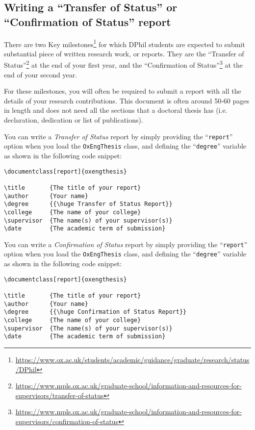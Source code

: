 \subsection{Writing a ``Transfer of Status'' or ``Confirmation of Status'' report}


There are two Key milestones\footnote{\url{https://www.ox.ac.uk/students/academic/guidance/graduate/research/status/DPhil}} for which DPhil students are expected to submit substantial piece of written research work, or reports. They are the ``Transfer of Status''\footnote{\url{https://www.mpls.ox.ac.uk/graduate-school/information-and-resources-for-supervisors/transfer-of-status}} at the end of your first year, and the ``Confirmation of Status''\footnote{\url{https://www.mpls.ox.ac.uk/graduate-school/information-and-resources-for-supervisors/confirmation-of-status}} at the end of your second year. 

For these milestones, you will often be required to submit a report with all the details of your research contributions. This document is often around 50-60 pages in length and does not need all the sections that a doctoral thesis has (i.e. declaration, dedication or list of publications). 

You can write a \textit{Transfer of Status} report by simply providing the ``\verb|report|'' option when you load the \verb|OxEngThesis| class, and defining the ``\verb|degree|'' variable as shown in the following code snippet:


\begin{lstlisting}[style=custom-latex]
\documentclass[report]{oxengthesis}

\title       {The title of your report}
\author      {Your name}
\degree      {{\huge Transfer of Status Report}}
\college     {The name of your college}
\supervisor  {The name(s) of your supervisor(s)}
\date        {The academic term of submission}
\end{lstlisting}


You can write a \textit{Confirmation of Status} report by simply providing the ``\verb|report|'' option when you load the \verb|OxEngThesis| class, and defining the ``\verb|degree|'' variable as shown in the following code snippet:


\begin{lstlisting}[style=custom-latex]
\documentclass[report]{oxengthesis}

\title       {The title of your report}
\author      {Your name}
\degree      {{\huge Confirmation of Status Report}}
\college     {The name of your college}
\supervisor  {The name(s) of your supervisor(s)}
\date        {The academic term of submission}
\end{lstlisting}


